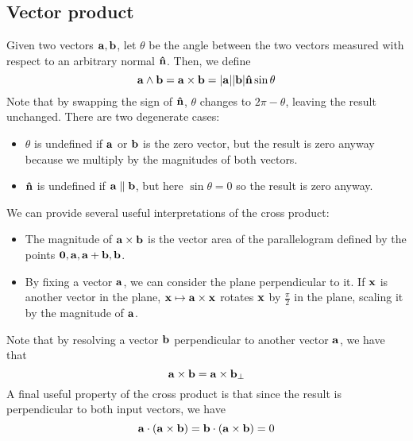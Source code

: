 \subsection{Vector product}
\begin{definition}
	Given two vectors \(\vb a, \vb b\), let \(\theta\) be the angle between the two vectors measured with respect to an arbitrary normal \(\vb{\hat n}\).
	Then, we define
	\[
		\vb a \wedge \vb b = \vb a \times \vb b = \abs{\vb a} \abs{\vb b} \vb{\hat n} \sin \theta
	\]
	Note that by swapping the sign of \(\vb{\hat n}\), \(\theta\) changes to \(2 \pi - \theta\), leaving the result unchanged.
	There are two degenerate cases:
	\begin{itemize}
		\item \(\theta\) is undefined if \(\vb a\) or \(\vb b\) is the zero vector, but the result is zero anyway because we multiply by the magnitudes of both vectors.
		\item \(\vb{\hat n}\) is undefined if \(\vb a \parallel \vb b\), but here \(\sin \theta = 0\) so the result is zero anyway.
	\end{itemize}
\end{definition}
We can provide several useful interpretations of the cross product:
\begin{itemize}
	\item The magnitude of \(\vb a \times \vb b\) is the vector area of the parallelogram defined by the points \(\vb 0, \vb a, \vb a + \vb b, \vb b\).
	\item By fixing a vector \(\vb a\), we can consider the plane perpendicular to it.
	      If \(\vb x\) is another vector in the plane, \(\vb x \mapsto \vb a \times \vb x\) rotates \(\vb x\) by \(\frac{\pi}{2}\) in the plane, scaling it by the magnitude of \(\vb a\).
\end{itemize}
Note that by resolving a vector \(\vb b\) perpendicular to another vector \(\vb a\), we have that
\[
	\vb a \times \vb b = \vb a \times \vb b_\perp
\]
A final useful property of the cross product is that since the result is perpendicular to both input vectors, we have
\[
	\vb a \cdot (\vb a \times \vb b) = \vb b \cdot(\vb a \times \vb b) = 0
\]

